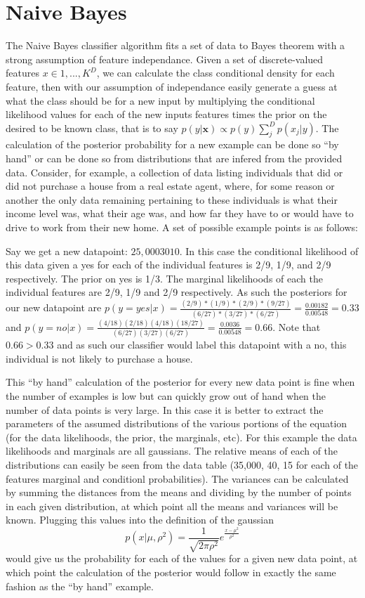 \section{Naive Bayes}
The Naive Bayes classifier algorithm fits a set of data to Bayes theorem with a strong assumption of
feature independance. Given a set of discrete-valued features $x \in {1,...,K}^D$, we can calculate
the class conditional density for each feature, then with our assumption of independance easily generate
a guess at what the class should be for a new input by multiplying the conditional likelihood values
for each of the new inputs features times the prior on the desired to be known class, that is to say
$p(y|\textbf{x}) \propto p(y) \sum_{j}^{D}p(x_j|y)$. The calculation of the posterior probability for a new
example can be done so ``by hand'' or can be done so from distributions that are infered from the
provided data. Consider, for example, a collection of data listing individuals that did or did not purchase
a house from a real estate agent, where, for some reason or another the only data remaining pertaining to
these individuals is what their income level was, what their age was, and how far they have to or would have
to drive to work from their new home. A set of possible example points is as follows:

Say we get a new datapoint: $25,000 30 10$. In this case the conditional likelihood of this data given a
yes for each of the individual features is 2/9, 1/9, and 2/9 respectively. The prior on yes is 1/3. The
marginal likelihoods of each the individual features are 2/9, 1/9 and 2/9 respectively. As such the
posteriors for our new datapoint are $p(y=yes|x)=\frac{(2/9)*(1/9)*(2/9)*(9/27)}{(6/27)*(3/27)*(6/27)} = \frac{0.00182}{0.00548} = 0.33$ and $p(y=no|x)=\frac{(4/18)(2/18)(4/18)(18/27)}{(6/27)(3/27)(6/27)} = \frac{0.0036}{0.00548} = 0.66$. Note that $0.66 > 0.33$ and as such our classifier would label this datapoint with
a no, this individual is not likely to purchase a house.

This ``by hand'' calculation of the posterior for every new data point is fine when the number of
examples is low but can quickly grow out of hand when the number of data points is very large. In
this case it is better to extract the parameters of the assumed distributions of the various
portions of the equation (for the data likelihoods, the prior, the marginals, etc). For this example
the data likelihoods and marginals are all gaussians. The relative means of each of the distributions can
easily be seen from the data table (35,000, 40, 15 for each of the features marginal and conditionl
probabilities). The variances can be calculated by summing the distances from the means and dividing by
the number of points in each given distribution, at which point all the means and variances will be known.
Plugging this values into the definition of the gaussian $$p(x|\mu,\rho^{2})=\frac{1}{\sqrt{2\pi\rho^{2}}}e^{\frac{x-\mu^{2}}{\rho^{2}}}$$ would give us the probability for each of the values for a given new data point,
at which point the calculation of the posterior would follow in exactly the same fashion as the ``by hand'' example.

